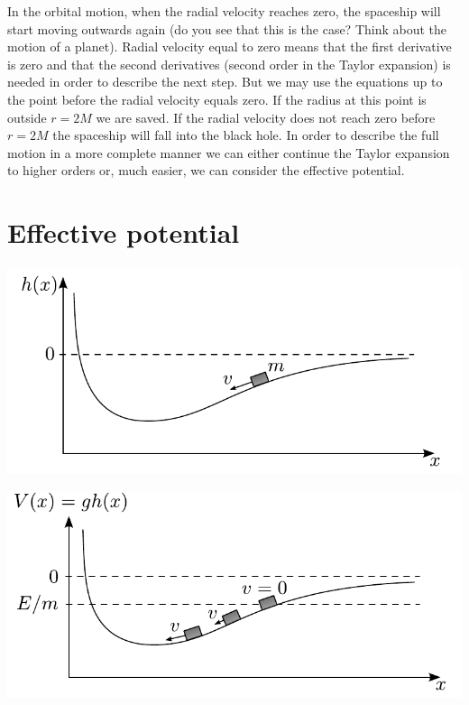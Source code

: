 {\begin{multicols}{2}
In the orbital motion, when the radial velocity reaches zero, the spaceship will start moving outwards again (do you see that this is the case? Think about the motion of a planet). Radial velocity equal to zero means that the first derivative is zero and that the second derivatives (second order in the Taylor expansion) is needed in order to describe the next step. But we may use the equations up to the point before the radial velocity equals zero. If the radius at this point is outside $r=2M$ we are saved. If the radial velocity does not reach zero before $r=2M$ the spaceship will fall into the black hole. In order to describe the full motion in a more complete manner we can either continue the Taylor expansion to higher orders or, much easier, we can consider the effective potential.

\section{Effective potential}


\begin{Figure}
\centering
\includegraphics[width=\textwidth]{fig_17-2.pdf}
\end{Figure}
\begin{Figure}
\centering
\includegraphics[width=\textwidth]{fig_17-3.pdf}
\end{Figure}




\end{multicols}}
